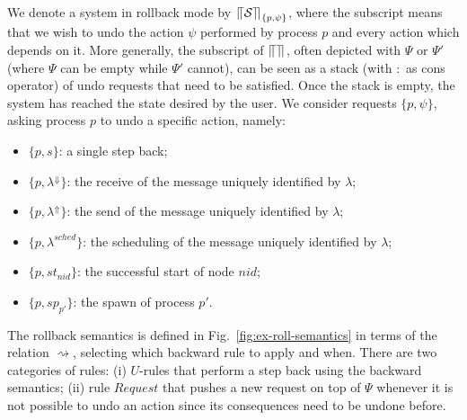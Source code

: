 \documentclass[runningheads]{llncs}
\newcommand{\system}{{\mathcal S}}
\newcommand{\sqll}{\mbox{$\lceil\hspace{-.5ex}\lceil$}}
\newcommand{\sqrr}{\mbox{$\rceil\hspace{-.4ex}\rceil$}}
\newcommand{\gn}{\rightsquigarrow}
\begin{document}
We denote a system in rollback mode by $\sqll \system \sqrr_{\{p,\psi\}}$, 
where the subscript means that we wish to undo the action $\psi$ performed by process $p$ 
and  every action which depends on it.
More generally, the subscript of $\sqll \sqrr$, often depicted with $\Psi$ or
$\Psi'$ (where $\Psi$ can be empty while $\Psi'$ cannot), can be seen as a stack (with $:$ as cons operator) of undo requests that need to be satisfied. Once the stack is empty, the system has reached the state desired by the user.
We consider requests $\{p,\psi\}$, asking process $p$ to undo a specific action, namely:
\begin{itemize}
	\item $\{p,s\}$: a single step back;
	\item $\{p,\lambda^{\Downarrow}\}$: the receive of the message uniquely identified by $\lambda$;
	\item $\{p,\lambda^{\Uparrow}\}$: the send of the message uniquely identified by $\lambda$;
	\item $\{p,\lambda^{sched}\}$: the scheduling of the message uniquely identified by $\lambda$;
	\item $\{p, st_{nid}\}$: the successful start of node $nid$;
	\item $\{p, sp_{p'}\}$: the spawn of process $p'$.
\end{itemize}

The rollback semantics is defined in
Fig.~\ref{fig:ex-roll-semantics} in terms of the relation $\gn$,
selecting which backward rule to apply and when.
There are two categories of rules: (i) $U$-rules that
perform a step back using the backward semantics; (ii) rule $Request$ that pushes a new
request on top of $\Psi$ whenever it is not possible to undo an action since its consequences need to be undone before.

\end{document}
